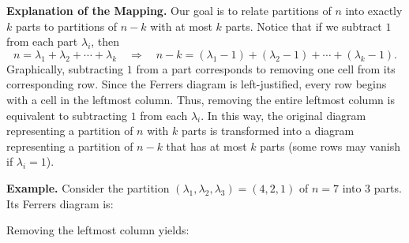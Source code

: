 \documentclass{article}
\begin{document}
\medskip

\textbf{Explanation of the Mapping.}  
Our goal is to relate partitions of \(n\) into exactly \(k\) parts to partitions of \(n-k\) with at most \(k\) parts. Notice that if we subtract \(1\) from each part \(\lambda_i\), then
\[
n = \lambda_1+\lambda_2+\cdots+\lambda_k \quad \Longrightarrow \quad n-k = (\lambda_1-1)+(\lambda_2-1)+\cdots+(\lambda_k-1).
\]
Graphically, subtracting \(1\) from a part corresponds to removing one cell from its corresponding row. Since the Ferrers diagram is left-justified, every row begins with a cell in the leftmost column. Thus, removing the entire leftmost column is equivalent to subtracting \(1\) from each \(\lambda_i\). In this way, the original diagram representing a partition of \(n\) with \(k\) parts is transformed into a diagram representing a partition of \(n-k\) that has at most \(k\) parts (some rows may vanish if \(\lambda_i=1\)).

\medskip

\textbf{Example.} Consider the partition \((\lambda_1,\lambda_2,\lambda_3)=(4,2,1)\) of \(n=7\) into \(3\) parts. Its Ferrers diagram is:

\begin{center}
\end{center}

Removing the leftmost column yields:

\begin{center}
\end{center}
\end{document}
